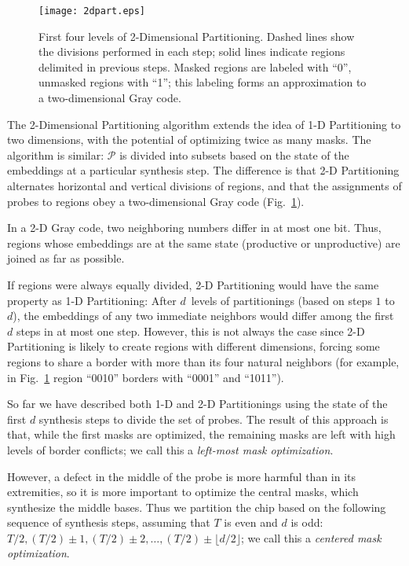 \begin{figure}[t]\centering
\texttt{[image: 2dpart.eps]}
\caption{\label{fig:2dpart}%
  First four levels of 2-Dimensional Partitioning. Dashed lines show
  the divisions performed in each step; solid lines indicate regions
  delimited in previous steps. Masked regions are labeled with ``0'',
  unmasked regions with ``1''; this labeling forms an approximation to
  a two-dimensional Gray code.}%
\end{figure}

The 2-Dimensional Partitioning algorithm extends the idea of 1-D
Partitioning to two dimensions, with the potential of optimizing twice
as many masks. The algorithm is similar: $\mathcal{P}$ is divided into
subsets based on the state of the embeddings at a particular
synthesis step. The difference is that 2-D Partitioning alternates
horizontal and vertical divisions of regions, and that the assignments
of probes to regions obey a two-dimensional Gray code
(Fig.~\ref{fig:2dpart}).

In a 2-D Gray code, two neighboring numbers differ in at most one
bit.  Thus, regions whose embeddings are at the same state (productive or
unproductive) are joined as far as possible.

If regions were always equally divided, 2-D Partitioning would have
the same property as 1-D Partitioning: After $d$~levels of
partitionings (based on steps $1$ to $d$), the embeddings of any two
immediate neighbors would differ among the first $d$ steps in at most
one step. However, this is not always the case since 2-D Partitioning
is likely to create regions with different dimensions, forcing some
regions to share a border with more than its four natural neighbors
(for example, in Fig.~\ref{fig:2dpart} region ``0010'' borders with
``0001'' and ``1011'').

So far we have described both 1-D and 2-D Partitionings using the
state of the first $d$ synthesis steps to divide the set of probes.
The result of this approach is that, while the first masks are
optimized, the remaining masks are left with high levels of border
conflicts; we call this a \emph{left-most mask optimization}.

However, a defect in the middle of the probe is more harmful than in
its extremities, so it is more important to optimize the central masks,
which synthesize the middle bases. Thus we
partition the chip based on the following sequence
of synthesis steps, assuming that $T$ is even and $d$ is odd: $T/2,
(T/2)\pm 1, (T/2)\pm 2, \dots, (T/2)\pm\lfloor d/2\rfloor$; we call
this a \emph{centered mask optimization}.

